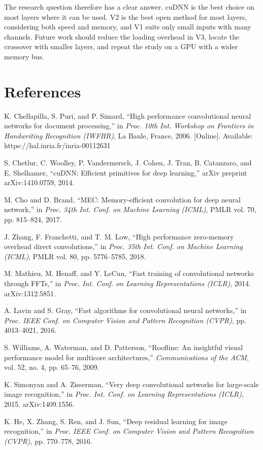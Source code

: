\documentclass[12pt,a4paper]{article}
\begin{document}
The research question therefore has a clear answer. cuDNN is the best choice on most layers where it can be used. V2 is the best open method for most layers, considering both speed and memory, and V1 suits only small inputs with many channels. Future work should reduce the loading overhead in V3, locate the crossover with smaller layers, and repeat the study on a GPU with a wider memory bus.

\section*{References}
\begin{list}{}{\setlength{\leftmargin}{2em}\setlength{\itemindent}{-2em}\setlength{\itemsep}{4pt}\setlength{\parsep}{0pt}}
\item[] [1] K. Chellapilla, S. Puri, and P. Simard, “High performance convolutional neural networks for document processing,” in \textit{Proc. 10th Int. Workshop on Frontiers in Handwriting Recognition (IWFHR)}, La Baule, France, 2006. [Online]. Available: https://hal.inria.fr/inria-00112631
\item[] [2] S. Chetlur, C. Woolley, P. Vandermersch, J. Cohen, J. Tran, B. Catanzaro, and E. Shelhamer, “cuDNN: Efficient primitives for deep learning,” arXiv preprint arXiv:1410.0759, 2014.
\item[] [3] M. Cho and D. Brand, “MEC: Memory-efficient convolution for deep neural network,” in \textit{Proc. 34th Int. Conf. on Machine Learning (ICML)}, PMLR vol. 70, pp. 815–824, 2017.
\item[] [4] J. Zhang, F. Franchetti, and T. M. Low, “High performance zero-memory overhead direct convolutions,” in \textit{Proc. 35th Int. Conf. on Machine Learning (ICML)}, PMLR vol. 80, pp. 5776–5785, 2018.
\item[] [5] M. Mathieu, M. Henaff, and Y. LeCun, “Fast training of convolutional networks through FFTs,” in \textit{Proc. Int. Conf. on Learning Representations (ICLR)}, 2014. arXiv:1312.5851.
\item[] [6] A. Lavin and S. Gray, “Fast algorithms for convolutional neural networks,” in \textit{Proc. IEEE Conf. on Computer Vision and Pattern Recognition (CVPR)}, pp. 4013–4021, 2016.
\item[] [7] S. Williams, A. Waterman, and D. Patterson, “Roofline: An insightful visual performance model for multicore architectures,” \textit{Communications of the ACM}, vol. 52, no. 4, pp. 65–76, 2009.
\item[] [8] K. Simonyan and A. Zisserman, “Very deep convolutional networks for large-scale image recognition,” in \textit{Proc. Int. Conf. on Learning Representations (ICLR)}, 2015. arXiv:1409.1556.
\item[] [9] K. He, X. Zhang, S. Ren, and J. Sun, “Deep residual learning for image recognition,” in \textit{Proc. IEEE Conf. on Computer Vision and Pattern Recognition (CVPR)}, pp. 770–778, 2016.
\end{list}
\end{document}
